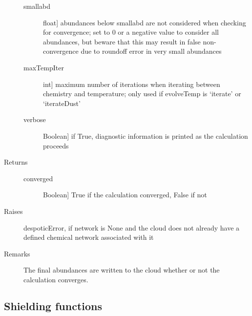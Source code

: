 \documentclass[letterpaper,10pt,english]{sphinxmanual}
\begin{document}
\begin{fulllineitems}
\begin{description}
\begin{description}
\item[{smallabd}] \leavevmode{[}float{]}
abundances below smallabd are not considered when checking for
convergence; set to 0 or a negative value to consider all
abundances, but beware that this may result in false
non-convergence due to roundoff error in very small abundances

\item[{maxTempIter}] \leavevmode{[}int{]}
maximum number of iterations when iterating between chemistry
and temperature; only used if evolveTemp is `iterate' or
`iterateDust'

\item[{verbose}] \leavevmode{[}Boolean{]}
if True, diagnostic information is printed as the calculation
proceeds

\end{description}

\item[{Returns}] \leavevmode\begin{description}
\item[{converged}] \leavevmode{[}Boolean{]}
True if the calculation converged, False if not

\end{description}

\item[{Raises}] \leavevmode
despoticError, if network is None and the cloud does not already
have a defined chemical network associated with it

\item[{Remarks}] \leavevmode
The final abundances are written to the cloud whether or not the
calculation converges.

\end{description}

\end{fulllineitems}



\subsection{Shielding functions}
\label{fulldoc:shielding-functions}
\end{document}
